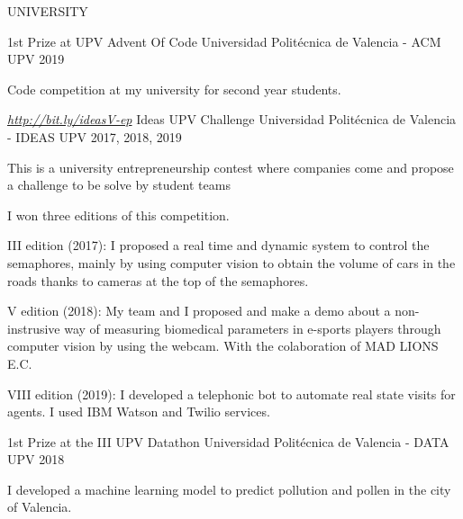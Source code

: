 \vspace{3mm}

UNIVERSITY

\begin{cventries}

  \cventry
    {} %
    {1st Prize at UPV Advent Of Code} %
    {Universidad Politécnica de Valencia - ACM UPV} %
    {2019} %
    {\begin{cvitems}
    \item Code competition at my university for second year students.
    \end{cvitems}}

  \cventry
    {\href{http://bit.ly/ideasV-ep}{\textit{http://bit.ly/ideasV-ep}}} %
    {Ideas UPV Challenge} %
    {Universidad Politécnica de Valencia - IDEAS UPV} %
    {2017, 2018, 2019} %
    {\begin{cvitems}
    \item This is a university entrepreneurship contest where companies come and propose a challenge to be solve by student teams
    \item I won three editions of this competition. 
    \item III edition (2017): I proposed a real time and dynamic system to control the semaphores, mainly by using computer vision to obtain the volume of cars in the roads thanks to cameras at the top of the semaphores.
    \item V edition (2018): My team and I proposed and make a demo about a non-instrusive way of measuring biomedical parameters in e-sports players through computer vision by using the webcam. With the colaboration of MAD LIONS E.C.
    \item VIII edition (2019): I developed a telephonic bot to automate real state visits for agents. I used IBM Watson and Twilio services.
    \end{cvitems}}
    
  \cventry
    {} %
    {1st Prize at the III UPV Datathon} %
    {Universidad Politécnica de Valencia - DATA UPV} %
    {2018} %
    {\begin{cvitems}
    \item  I developed a machine learning model to predict pollution and pollen in the city of Valencia.
    \end{cvitems}}

\end{cventries}